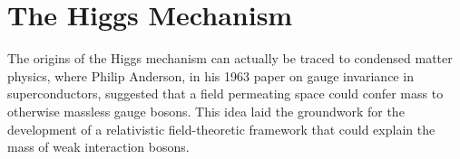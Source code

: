 








\section{The Higgs Mechanism}

The origins of the Higgs mechanism can actually be traced to condensed matter physics, where Philip Anderson, in his 1963 paper on gauge invariance in superconductors, suggested that a field permeating space could confer mass to otherwise massless gauge bosons. This idea laid the groundwork for the development of a relativistic field-theoretic framework that could explain the mass of weak interaction bosons.

